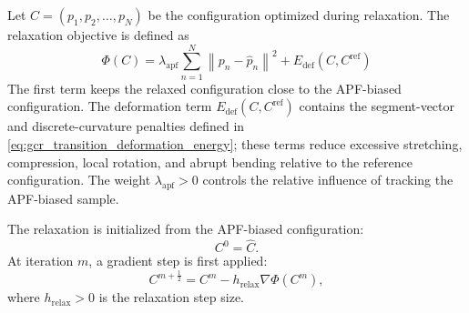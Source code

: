 \documentclass{pas}
\begin{document}
Let \(C=(p_1,p_2,\ldots,p_N)\) be the configuration optimized during
relaxation. The relaxation objective is defined as
\begin{equation}
\Phi(C)
=
\lambda_{\mathrm{apf}}
\sum_{n=1}^{N}
\left\|
p_n-\widehat{p}_n
\right\|^2
+
E_{\mathrm{def}}(C,C^{\mathrm{ref}})
\label{eq:relaxation_objective}
\end{equation}
The first term keeps the relaxed configuration close to the APF-biased configuration. The deformation term \(E_{\mathrm{def}}(C,C^{\mathrm{ref}})\) contains the segment-vector and discrete-curvature penalties defined in \eqref{eq:gcr_transition_deformation_energy}; these terms reduce excessive stretching, compression, local rotation, and abrupt bending relative to the reference configuration. The weight \(\lambda_{\mathrm{apf}}>0\) controls the relative influence of tracking the APF-biased sample.

The relaxation is initialized from the APF-biased configuration:
\begin{equation}
C^0=\widehat{C}.
\label{eq:relaxation_initial_condition}
\end{equation}
At iteration \(m\), a gradient step is first applied:
\begin{equation}
C^{m+\frac{1}{2}}
=
C^m
-
h_{\mathrm{relax}}
\nabla \Phi(C^m),
\label{eq:relaxation_gradient_step}
\end{equation}
where \(h_{\mathrm{relax}}>0\) is the relaxation step size.
\end{document}
